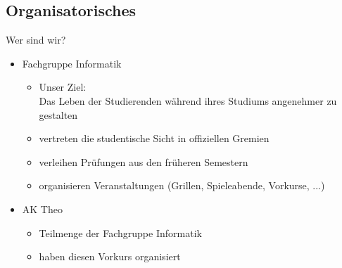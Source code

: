 \subsection{Organisatorisches}
\begin{frame}[fragile]{Wer sind wir?}
    \begin{itemize}
        \item 
            Fachgruppe Informatik
            \begin{itemize}
                \item Unser Ziel: \\
                Das Leben der Studierenden während ihres Studiums angenehmer zu gestalten
                \item vertreten die studentische Sicht in offiziellen Gremien
                \item verleihen Prüfungen aus den früheren Semestern
                \item organisieren Veranstaltungen (Grillen, Spieleabende, Vorkurse, ...)
            \end{itemize}
        \item AK Theo
        \begin{itemize}
            \item Teilmenge der Fachgruppe Informatik
            \item haben diesen Vorkurs organisiert
        \end{itemize}
    \end{itemize}
\end{frame}

